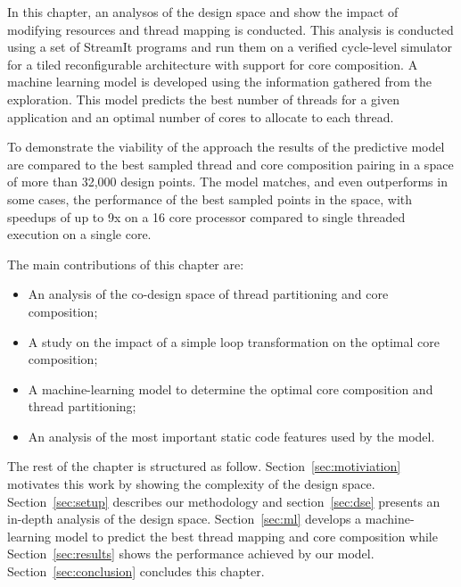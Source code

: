 In this chapter, an analysos of the design space and show the impact of modifying resources and thread mapping is conducted.
This analysis is conducted using a set of StreamIt programs and run them on a verified cycle-level simulator for a tiled reconfigurable architecture with support for core composition.
A machine learning model is developed using the information gathered from the exploration.
This model predicts the best number of threads for a given application and an optimal number of cores to allocate to each thread.

To demonstrate the viability of the approach the results of the predictive model are compared to the best sampled thread and core composition pairing in a space of more than 32,000 design points.
The model matches, and even outperforms in some cases, the performance of the best sampled points in the space, with speedups of up to 9x on a 16 core processor compared to single threaded execution on a single core. 

The main contributions of this chapter are:
\vspace{-1mm}
\begin{itemize}
\item An analysis of the co-design space of thread partitioning and core composition;
\item A study on the impact of a simple loop transformation on the optimal core composition;
\item A machine-learning model to determine the optimal core composition and thread partitioning;
\item An analysis of the most important static code features used by the model.
\end{itemize}


The rest of the chapter is structured as follow.
Section~\ref{sec:motiviation} motivates this work by showing the complexity of the design space.
Section~\ref{sec:setup} describes our methodology and section~\ref{sec:dse} presents an in-depth analysis of the design space.
Section~\ref{sec:ml} develops a machine-learning model to predict the best thread mapping and core composition while Section~\ref{sec:results} shows the performance achieved by our model.
Section~\ref{sec:conclusion} concludes this chapter.
